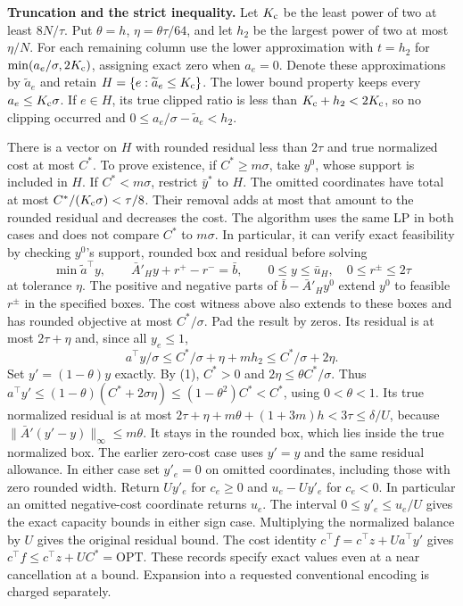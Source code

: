 \documentclass[11pt]{article}
\begin{document}
\textbf{Truncation and the strict inequality.} Let \(K_{\rm c}\) be the least power of two at least \(8N/\tau\). Put \(\theta=h\), \(\eta=\theta\tau/64\), and let \(h_2\) be the largest power of two at most \(\eta/N\). For each remaining column use the lower approximation with \(t=h_2\) for \(\min(a_e/\sigma,2K_{\rm c})\), assigning exact zero when \(a_e=0\). Denote these approximations by \(\widetilde a_e\) and retain \(H=\{e:\widetilde a_e\le K_{\rm c}\}\). The lower bound property keeps every \(a_e\le K_{\rm c}\sigma\). If \(e\in H\), its true clipped ratio is less than \(K_{\rm c}+h_2<2K_{\rm c}\), so no clipping occurred and \(0\le a_e/\sigma-\widetilde a_e<h_2\).

There is a vector on \(H\) with rounded residual less than \(2\tau\) and true normalized cost at most \(C^*\). To prove existence, if \(C^*\ge m\sigma\), take \(y^0\), whose support is included in \(H\). If \(C^*<m\sigma\), restrict \(\bar y^*\) to \(H\). The omitted coordinates have total at most \(C^*/(K_{\rm c}\sigma)<\tau/8\). Their removal adds at most that amount to the rounded residual and decreases the cost. The algorithm uses the same LP in both cases and does not compare \(C^*\) to \(m\sigma\). In particular, it can verify exact feasibility by checking \(y^0\)'s support, rounded box and residual before solving
\[
 \min\widetilde a^\top y,\qquad
 \bar A'_H y+r^+-r^-=\bar b,\qquad
 0\le y\le\bar u_H,\quad 0\le r^\pm\le2\tau
\]
at tolerance \(\eta\). The positive and negative parts of \(\bar b-\bar A'_H y^0\) extend \(y^0\) to feasible \(r^\pm\) in the specified boxes. The cost witness above also extends to these boxes and has rounded objective at most \(C^*/\sigma\). Pad the result by zeros. Its residual is at most \(2\tau+\eta\) and, since all \(y_e\le1\),
\[
 a^\top y/\sigma\le C^*/\sigma+\eta+mh_2\le C^*/\sigma+2\eta.
\]
Set \(y'=(1-\theta)y\) exactly. By (1), \(C^*>0\) and \(2\eta\le\theta C^*/\sigma\). Thus \(a^\top y'\le(1-\theta)(C^*+2\sigma\eta)\le(1-\theta^2)C^*<C^*\), using \(0<\theta<1\). Its true normalized residual is at most \(2\tau+\eta+m\theta+(1+3m)h<3\tau\le\delta/U\), because \(\|\bar A'(y'-y)\|_\infty\le m\theta\). It stays in the rounded box, which lies inside the true normalized box. The earlier zero-cost case uses \(y'=y\) and the same residual allowance. In either case set \(y'_e=0\) on omitted coordinates, including those with zero rounded width. Return \(Uy'_e\) for \(c_e\ge0\) and \(u_e-Uy'_e\) for \(c_e<0\). In particular an omitted negative-cost coordinate returns \(u_e\). The interval \(0\le y'_e\le u_e/U\) gives the exact capacity bounds in either sign case. Multiplying the normalized balance by \(U\) gives the original residual bound. The cost identity \(c^\top f=c^\top z+Ua^\top y'\) gives \(c^\top f\le c^\top z+UC^*=\mathrm{OPT}\). These records specify exact values even at a near cancellation at a bound. Expansion into a requested conventional encoding is charged separately.
\end{document}
